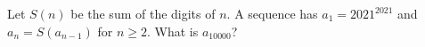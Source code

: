 Let $S(n)$ be the sum of the digits of $n$. A sequence has $a_1=2021^{2021}$ and $a_n=S(a_{n-1})$ for $n\ge2$. What is $a_{10000}$?
